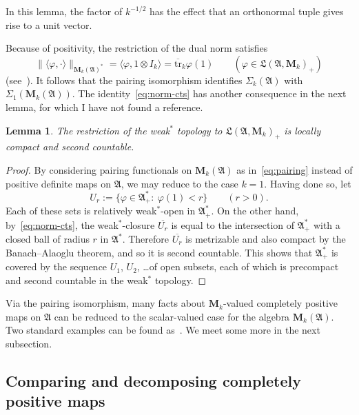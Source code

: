 \documentclass[12pt,a4paper]{article}
\numberwithin{equation}{section}
\newtheorem{lem}[thm]{Lemma}
\theoremstyle{remark}
\newcommand{\rmM}{\mathbf{M}}
\newcommand{\A}{\mathfrak{A}}
\newcommand{\frL}{\mathfrak{L}}
\renewcommand{\S}{\Sigma}
\renewcommand{\phi}{\varphi}
\newcommand{\ol}[1]{\overline{#1}}
\newcommand{\tr}{\overline{\mathrm{tr}}}
\begin{document}
In this lemma, the factor of $k^{-1/2}$ has the effect that an orthonormal tuple gives rise to a unit vector.

Because of positivity, the restriction of the dual norm satisfies
\begin{equation}\label{eq:norm-cts}
\|\langle \phi,\cdot\rangle\|_{\rmM_k(\A)^\ast} = \langle \phi,1\otimes I_k\rangle = \tr_k\phi(1) \qquad (\phi \in \frL(\A,\rmM_k)_+)
\end{equation}
(see~\cite[Prop. 2.1.4]{Dix--Cstar}).  It follows that the pairing isomorphism identifies $\S_k(\A)$ with $\S_1(\rmM_k(\A))$.  The identity~\eqref{eq:norm-cts} has another consequence in the next lemma, for which I have not found a reference.

\begin{lem}\label{lem:lcsc}
The restriction of the weak$^\ast$ topology to $\frL(\A,\rmM_k)_+$ is locally compact and second countable.
\end{lem}

\begin{proof}
By considering pairing functionals on $\rmM_k(\A)$ as in~\eqref{eq:pairing} instead of positive definite maps on $\A$, we may reduce to the case $k=1$.  Having done so, let
\[U_r := \{\phi \in \A^\ast_+:\ \phi(1) < r\} \qquad (r > 0).\]
Each of these sets is relatively weak$^\ast$-open in $\A^\ast_+$.  On the other hand, by~\eqref{eq:norm-cts}, the weak$^\ast$-closure $\ol{U_r}$ is equal to the intersection of $\A^\ast_+$ with a closed ball of radius $r$ in $\A^\ast$.  Therefore $\ol{U_r}$ is metrizable and also compact by the Banach--Alaoglu theorem, and so it is second countable.  This shows that $\A^\ast_+$ is covered by the sequence $U_1$, $U_2$, \dots  of open subsets, each of which is precompact and second countable in the weak$^\ast$ topology. %
\end{proof}

Via the pairing isomorphism, many facts about $\rmM_k$-valued completely positive maps on $\A$ can be reduced to the scalar-valued case for the algebra $\rmM_k(\A)$.  Two standard examples can be found as~\cite[Cor. 1.5.16 and Prop. 1.7.1]{BroOza08}.  We meet some more in the next subsection. %







\subsection{Comparing and decomposing completely positive maps}\label{subs:cp-maps-compar}
\end{document}
